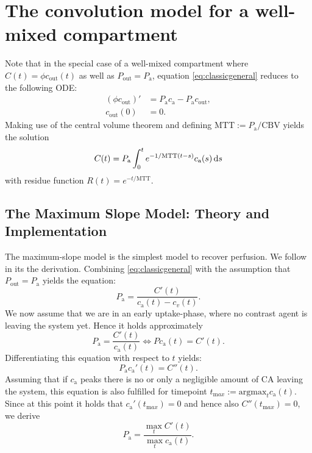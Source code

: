 \documentclass[paper=a4, fontsize=12pt,parskip=half,headings=small]{scrartcl}
\newcommand{\ca}{c_\mathrm{a}}
\newcommand{\CBV}{\mathrm{CBV}}
\newcommand{\MTT}{\mathrm{MTT}}
\newcommand{\cout}{c_{\mathrm{out}}}
\newcommand{\Pa}{P_{\mathrm{a}}}
\newcommand{\Pout}{P_{\mathrm{out}}}
\begin{document}
	\section{The convolution model for a well-mixed compartment} \label{sec:comp}
	Note that in the special case of a well-mixed compartment where $C(t) = \phi\cout(t)$ as well as $\Pout=\Pa$, equation \eqref{eq:classicgeneral} reduces to the following ODE:
	\begin{align*}
		(\phi \cout)' &= \Pa \ca - \Pa \cout, \\
		\cout(0)&=0.
	\end{align*}
	Making use of the central volume theorem \cite{sourbron13} and defining $\MTT:=\Pa/\CBV$ yields the solution
	\[
		C(t) = \Pa \int_0^t e^{-1/\MTT(t-s)}\ca(s)\diffint s
	\]
	with residue function $R(t)=e^{-t/\MTT}$. 

	
	
	
	\subsection{The Maximum Slope Model: Theory and Implementation}\label{sec:ms}	
	The maximum-slope model is the simplest model to recover perfusion.
	We follow \cite{klotz99} in its the derivation.
	Combining \eqref{eq:classicgeneral} with the assumption that $\Pout = \Pa$ yields the equation:
	\[
		\Pa = \frac{C'(t)}{\ca(t) - c_v(t)}.
	\]
	We now assume that we are in an early uptake-phase, where no contrast agent is leaving the system yet. 
	Hence it holds approximately
	\[
		\Pa = \frac{C'(t)}{\ca(t)} \iff P\ca(t) = C'(t).
	\]
	Differentiating this equation with respect to $t$ yields:
	\[
		\Pa \ca'(t) = C''(t).
	\]
	Assuming that if $\ca$ peaks there is no or only a negligible amount of CA leaving the system, this equation is also fulfilled for timepoint $t_{\mathrm max}:=\mathrm{argmax}_{t}\ca(t)$. 
	Since at this point it holds that $\ca'(t_{\mathrm max}) = 0$ and hence also $C''(t_{\mathrm max})=0$, we derive
	\begin{equation}\label{eq:MS}
		\Pa = \frac{\max_{t}C'(t)}{\max_{t}\ca(t)}.
	\end{equation}


\end{document}
